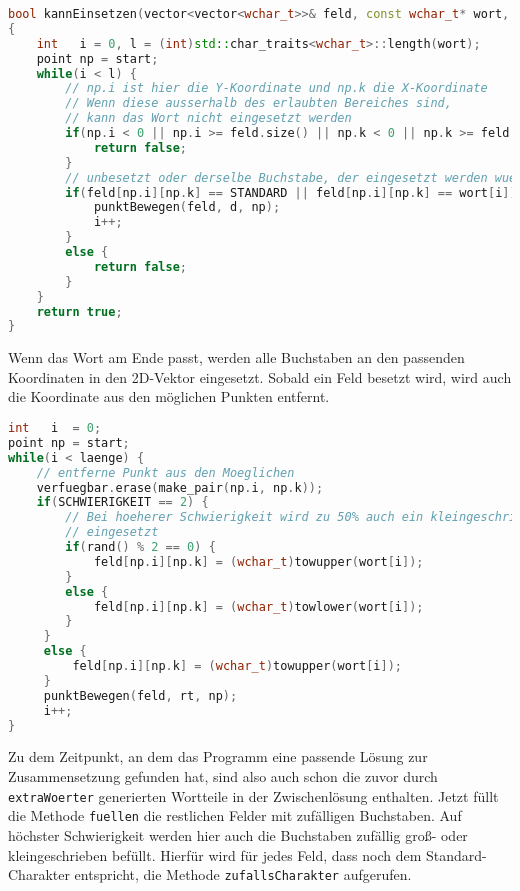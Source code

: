 \documentclass[a4paper,10pt,ngerman]{scrartcl}
\begin{document}
\begin{lstlisting}[language=C++]
bool kannEinsetzen(vector<vector<wchar_t>>& feld, const wchar_t* wort, point start, richtung d)
{
    int   i = 0, l = (int)std::char_traits<wchar_t>::length(wort);
    point np = start;
    while(i < l) {
    	// np.i ist hier die Y-Koordinate und np.k die X-Koordinate
    	// Wenn diese ausserhalb des erlaubten Bereiches sind,
    	// kann das Wort nicht eingesetzt werden
        if(np.i < 0 || np.i >= feld.size() || np.k < 0 || np.k >= feld[0].size()) {
            return false;
        }
        // unbesetzt oder derselbe Buchstabe, der eingesetzt werden wuerde
        if(feld[np.i][np.k] == STANDARD || feld[np.i][np.k] == wort[i]) {
            punktBewegen(feld, d, np);
            i++;
        }
        else {
            return false;
        }
    }
    return true;
}
\end{lstlisting}
Wenn das Wort am Ende passt, werden alle Buchstaben an den passenden Koordinaten in den 2D-Vektor eingesetzt.
Sobald ein Feld besetzt wird, wird auch die Koordinate aus den möglichen Punkten entfernt.
\begin{lstlisting}[language=C++]
int   i  = 0;
point np = start;
while(i < laenge) {
	// entferne Punkt aus den Moeglichen
    verfuegbar.erase(make_pair(np.i, np.k));
    if(SCHWIERIGKEIT == 2) {
    	// Bei hoeherer Schwierigkeit wird zu 50% auch ein kleingeschriebener Buchstabe
    	// eingesetzt
        if(rand() % 2 == 0) {
            feld[np.i][np.k] = (wchar_t)towupper(wort[i]);
        }
        else {
            feld[np.i][np.k] = (wchar_t)towlower(wort[i]);
        }
     }
     else {
         feld[np.i][np.k] = (wchar_t)towupper(wort[i]);
     }
     punktBewegen(feld, rt, np);
     i++;
}
\end{lstlisting}

Zu dem Zeitpunkt, an dem das Programm eine passende Lösung zur Zusammensetzung gefunden hat, sind also auch
schon die zuvor durch \lstinline{extraWoerter} generierten Wortteile in der Zwischenlösung enthalten.
Jetzt füllt die Methode \lstinline{fuellen} die restlichen Felder mit zufälligen Buchstaben. 
Auf höchster Schwierigkeit werden hier auch die Buchstaben zufällig groß- oder kleingeschrieben befüllt.
Hierfür wird für jedes Feld, dass noch dem Standard-Charakter entspricht, die Methode \lstinline{zufallsCharakter} aufgerufen.
\end{document}
